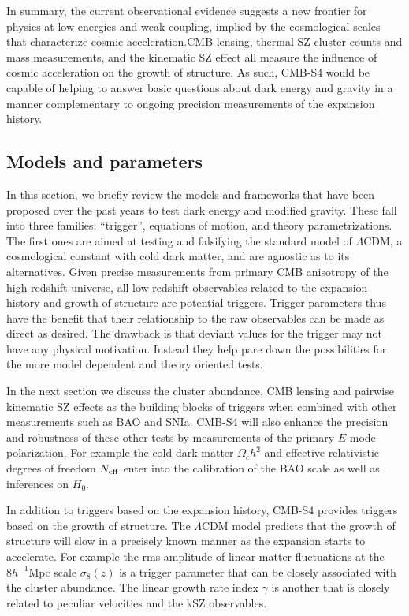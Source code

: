 In summary, the current observational evidence suggests a new frontier for physics at low energies and weak coupling, implied by the cosmological scales that characterize cosmic acceleration.CMB lensing, thermal SZ cluster counts and mass measurements, and the kinematic SZ effect  all measure the influence of cosmic acceleration on the growth of 
structure.   As such, CMB-S4 would be capable of helping to answer basic questions about dark energy and gravity in a manner complementary to ongoing precision measurements of the expansion history.    %


\subsection{Models and parameters}


In this section, we  briefly review the models and frameworks that have been proposed over the past years to test dark energy and modified gravity.   These fall into 
three families: ``trigger'', equations of motion, and theory parametrizations. The first ones are aimed at testing and falsifying the standard model
of $\Lambda$CDM, a cosmological constant with cold dark matter, and are agnostic as to its 
alternatives.  Given precise measurements from primary CMB anisotropy of the high redshift universe, all low redshift observables related to the expansion history and growth of
structure are potential triggers.  Trigger parameters thus have the benefit that their relationship to the raw observables can be made as direct as desired.   The drawback is 
that deviant values for the trigger may not have any physical motivation.  Instead they help pare down the possibilities for the more model
dependent and theory oriented tests.  


  In the next section we discuss the cluster abundance,
 CMB lensing and pairwise kinematic SZ effects as the building blocks of triggers when
 combined with other measurements such as BAO and SNIa.   CMB-S4 will also enhance the precision and robustness
 of these other tests by measurements of the primary $E$-mode polarization.   For example
 the cold dark matter $\Omega_c h^2$ and effective relativistic degrees of freedom $N_{\rm eff}$ enter into the calibration of the BAO scale as well as inferences on $H_0$. 
 
In addition to triggers based on the expansion history, CMB-S4 provides triggers based
on the growth of structure.  The $\Lambda$CDM model predicts that the growth of structure
will slow in a precisely known manner as the expansion starts to accelerate.   
For example the rms amplitude of linear matter fluctuations at the $8 h^{-1}$Mpc
scale $\sigma_8(z)$ is a trigger parameter that can be closely associated with the 
cluster abundance.   The linear growth rate index $\gamma$ is another that is closely related
to peculiar velocities and the kSZ observables.   

